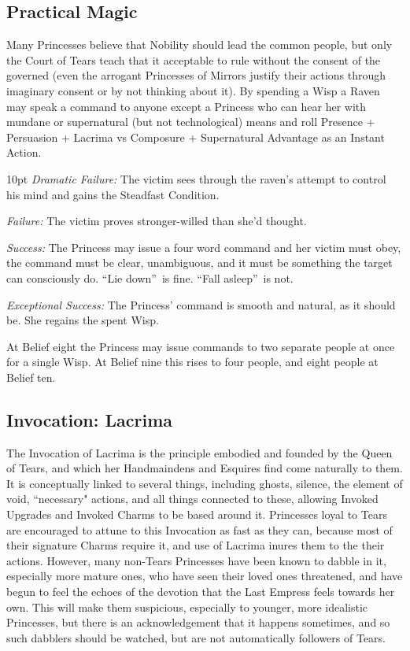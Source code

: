 \subsection*{Practical Magic}
Many Princesses believe that Nobility should lead the common people, but only the Court of Tears teach that it acceptable to rule without the consent of the governed (even the arrogant Princesses of Mirrors justify their actions through imaginary consent or by not thinking about it). By spending a Wisp a Raven may speak a command to anyone except a Princess who can hear her with mundane or supernatural (but not technological) means and roll Presence + Persuasion + Lacrima vs Composure + Supernatural Advantage as an Instant Action.

\begin{myindentpar}{10pt} \emph{Dramatic Failure:} The victim sees through the raven’s attempt to control his mind and gains the Steadfast Condition.
   
    \emph{Failure:} The victim proves stronger-willed than she’d thought.
	
    \emph{Success:}  The Princess may issue a four word command and her victim must obey, the command must be clear, unambiguous, and it must be something the target can consciously do. \textquotedblleft Lie down\textquotedblright\, is fine. \textquotedblleft Fall asleep\textquotedblright\, is not.
	
    \emph{Exceptional Success:} The Princess' command is smooth and natural, as it should be. She regains the spent Wisp.\end{myindentpar}

\noindent At Belief eight the Princess may issue commands to two separate people at once for a single Wisp. At Belief nine this rises to four people, and eight people at Belief ten.

\subsection*{Invocation: Lacrima}

The Invocation of Lacrima is the principle embodied and founded by the Queen of Tears, and which her Handmaindens and Esquires find come naturally to them. It is conceptually linked to several things, including ghosts, silence, the element of void, \textquotedblleft necessary" actions, and all things connected to these, allowing Invoked Upgrades and Invoked Charms to be based around it. Princesses loyal to Tears are encouraged to attune to this Invocation as fast as they can, because most of their signature Charms require it, and use of Lacrima inures them to the their actions. However, many non-Tears Princesses have been known to dabble in it, especially more mature ones, who have seen their loved ones threatened, and have begun to feel the echoes of the devotion that the Last Empress feels towards her own. This will make them suspicious, especially to younger, more idealistic Princesses, but there is an acknowledgement that it happens sometimes, and so such dabblers should be watched, but are not 
automatically followers of 
Tears.

